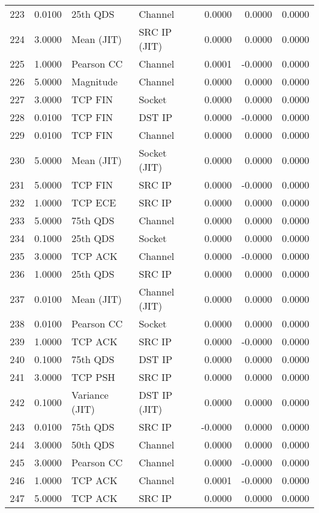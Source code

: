 \begin{longtable}{lrllrrr}
223 & 0.0100 & 25th QDS & Channel & 0.0000 & 0.0000 & 0.0000 \\
224 & 3.0000 & Mean (JIT) & SRC IP (JIT) & 0.0000 & 0.0000 & 0.0000 \\
225 & 1.0000 & Pearson CC & Channel & 0.0001 & -0.0000 & 0.0000 \\
226 & 5.0000 & Magnitude & Channel & 0.0000 & 0.0000 & 0.0000 \\
227 & 3.0000 & TCP FIN & Socket & 0.0000 & 0.0000 & 0.0000 \\
228 & 0.0100 & TCP FIN & DST IP & 0.0000 & -0.0000 & 0.0000 \\
229 & 0.0100 & TCP FIN & Channel & 0.0000 & 0.0000 & 0.0000 \\
230 & 5.0000 & Mean (JIT) & Socket (JIT) & 0.0000 & 0.0000 & 0.0000 \\
231 & 5.0000 & TCP FIN & SRC IP & 0.0000 & -0.0000 & 0.0000 \\
232 & 1.0000 & TCP ECE & SRC IP & 0.0000 & 0.0000 & 0.0000 \\
233 & 5.0000 & 75th QDS & Channel & 0.0000 & 0.0000 & 0.0000 \\
234 & 0.1000 & 25th QDS & Socket & 0.0000 & 0.0000 & 0.0000 \\
235 & 3.0000 & TCP ACK & Channel & 0.0000 & -0.0000 & 0.0000 \\
236 & 1.0000 & 25th QDS & SRC IP & 0.0000 & 0.0000 & 0.0000 \\
237 & 0.0100 & Mean (JIT) & Channel (JIT) & 0.0000 & 0.0000 & 0.0000 \\
238 & 0.0100 & Pearson CC & Socket & 0.0000 & 0.0000 & 0.0000 \\
239 & 1.0000 & TCP ACK & SRC IP & 0.0000 & -0.0000 & 0.0000 \\
240 & 0.1000 & 75th QDS & DST IP & 0.0000 & 0.0000 & 0.0000 \\
241 & 3.0000 & TCP PSH & SRC IP & 0.0000 & 0.0000 & 0.0000 \\
242 & 0.1000 & Variance (JIT) & DST IP (JIT) & 0.0000 & 0.0000 & 0.0000 \\
243 & 0.0100 & 75th QDS & SRC IP & -0.0000 & 0.0000 & 0.0000 \\
244 & 3.0000 & 50th QDS & Channel & 0.0000 & 0.0000 & 0.0000 \\
245 & 3.0000 & Pearson CC & Channel & 0.0000 & -0.0000 & 0.0000 \\
246 & 1.0000 & TCP ACK & Channel & 0.0001 & -0.0000 & 0.0000 \\
247 & 5.0000 & TCP ACK & SRC IP & 0.0000 & 0.0000 & 0.0000 \\

\end{longtable}
